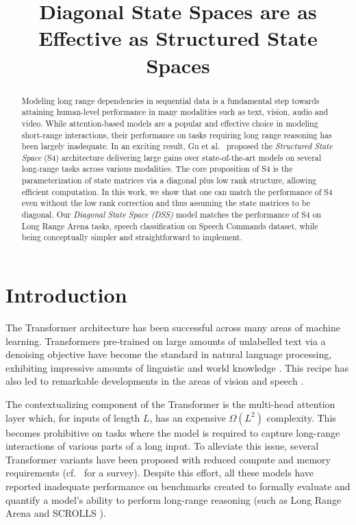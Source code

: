 \title{Diagonal State Spaces are as Effective as Structured State Spaces}

\begin{abstract}
Modeling long range dependencies in sequential data is a fundamental step towards attaining human-level performance in many modalities such as text, vision, audio and video. While attention-based models are a popular and effective choice in modeling short-range interactions, their performance on tasks requiring long range reasoning has been largely inadequate. In an exciting result, Gu et al.\ \cite{gu2022efficiently} proposed the \textit{Structured State Space} (S4) architecture delivering large gains over state-of-the-art models on several long-range tasks across various modalities. The core proposition of S4 is the parameterization of state matrices via a diagonal plus low rank structure, allowing efficient computation. In this work, we show that one can match the performance of S4 even without the low rank correction and thus assuming the state matrices to be diagonal. Our \textit{Diagonal State Space (DSS)} model matches the performance of S4 on Long Range Arena tasks, speech classification on Speech Commands dataset, while being conceptually simpler and straightforward to implement.
\end{abstract}

\section{Introduction}\label{sec:intro}

The Transformer architecture \cite{vaswani2017attention} has been successful across many areas of machine learning. Transformers pre-trained on large amounts of unlabelled text via a denoising objective have become the standard in natural language processing, exhibiting impressive amounts of linguistic and world knowledge \cite{Brown2020LanguageMA,Borgeaud2021ImprovingLM}. This recipe has also led to remarkable developments in the areas of vision \cite{Ramesh2021ZeroShotTG,Radford2021LearningTV} and speech \cite{dong2018speech,baevski2020wav2vec}.

The contextualizing component of the Transformer is the multi-head attention layer which, for inputs of length $L$, has an expensive $\Omega(L^2)$ complexity. This becomes prohibitive on tasks where the model is required to capture long-range interactions of various parts of a long input. To alleviate this issue, several Transformer variants have been proposed with reduced compute and memory requirements \cite{qiu2019blockwise,kitaev2020reformer,roy2020efficient,beltagy2020longformer,gupta2020gmat,katharopoulos2020transformers,Wang2020LinformerSW,Choromanski2020RethinkingAW,zhu-soricut-2021-h,gupta-etal-2021-memory} (cf.\ \cite{tay2020efficient} for a survey). Despite this effort, all these models have reported inadequate performance on benchmarks created to formally evaluate and quantify a model's ability to perform long-range reasoning (such as Long Range Arena \cite{tay2021long} and SCROLLS \cite{shaham2022scrolls}).

